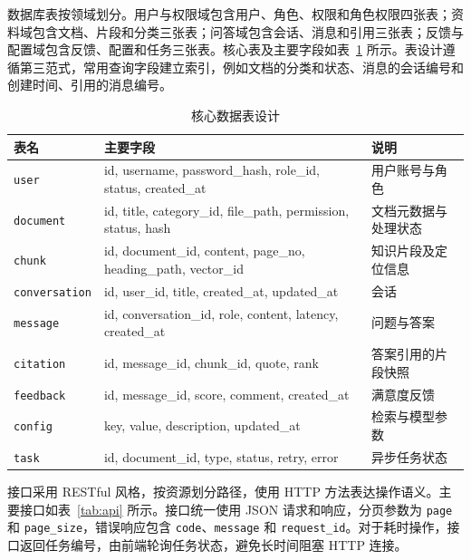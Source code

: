 数据库表按领域划分。用户与权限域包含用户、角色、权限和角色权限四张表；资料域包含文档、片段和分类三张表；问答域包含会话、消息和引用三张表；反馈与配置域包含反馈、配置和任务三张表。核心表及主要字段如表~\ref{tab:db} 所示。表设计遵循第三范式，常用查询字段建立索引，例如文档的分类和状态、消息的会话编号和创建时间、引用的消息编号。

\begin{table}[H]
  \centering
  \caption{核心数据表设计}
  \label{tab:db}
  \renewcommand{\arraystretch}{1.2}
  \begin{tabular}{p{2.8cm}p{6.0cm}p{3.9cm}}
    \toprule
    表名 & 主要字段 & 说明 \\
    \midrule
    \texttt{user} & id, username, password\_hash, role\_id, status, created\_at & 用户账号与角色 \\
    \texttt{document} & id, title, category\_id, file\_path, permission, status, hash & 文档元数据与处理状态 \\
    \texttt{chunk} & id, document\_id, content, page\_no, heading\_path, vector\_id & 知识片段及定位信息 \\
    \texttt{conversation} & id, user\_id, title, created\_at, updated\_at & 会话 \\
    \texttt{message} & id, conversation\_id, role, content, latency, created\_at & 问题与答案 \\
    \texttt{citation} & id, message\_id, chunk\_id, quote, rank & 答案引用的片段快照 \\
    \texttt{feedback} & id, message\_id, score, comment, created\_at & 满意度反馈 \\
    \texttt{config} & key, value, description, updated\_at & 检索与模型参数 \\
    \texttt{task} & id, document\_id, type, status, retry, error & 异步任务状态 \\
    \bottomrule
  \end{tabular}
\end{table}

接口采用 RESTful 风格，按资源划分路径，使用 HTTP 方法表达操作语义。主要接口如表~\ref{tab:api} 所示。接口统一使用 JSON 请求和响应，分页参数为 \texttt{page} 和 \texttt{page\_size}，错误响应包含 \texttt{code}、\texttt{message} 和 \texttt{request\_id}。对于耗时操作，接口返回任务编号，由前端轮询任务状态，避免长时间阻塞 HTTP 连接。

